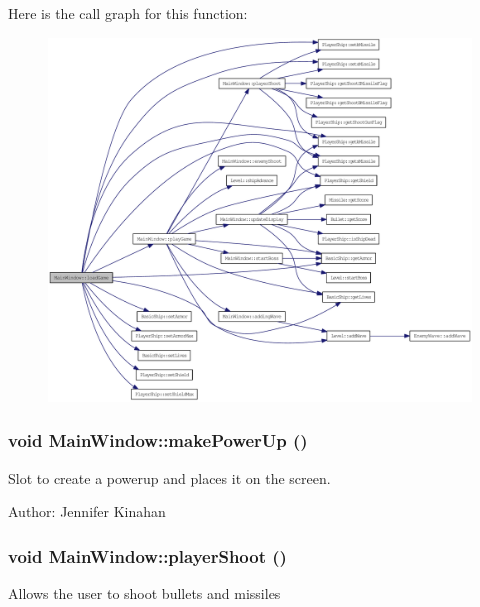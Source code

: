 Here is the call graph for this function:\nopagebreak
\begin{figure}[H]
\begin{center}
\leavevmode
\includegraphics[width=420pt]{class_main_window_af32531cf9be0011b3b3aa9cb1c159633_cgraph}
\end{center}
\end{figure}
\hypertarget{class_main_window_afa51f8b618e297e7b2ed6e9d1bfd38d7}{
\subsubsection[{makePowerUp}]{\setlength{\rightskip}{0pt plus 5cm}void MainWindow::makePowerUp ()}}
\label{class_main_window_afa51f8b618e297e7b2ed6e9d1bfd38d7}
Slot to create a powerup and places it on the screen.

Author: Jennifer Kinahan \hypertarget{class_main_window_a82a6ee47ad6e73ab2eb6816ee6324708}{
\subsubsection[{playerShoot}]{\setlength{\rightskip}{0pt plus 5cm}void MainWindow::playerShoot ()}}
\label{class_main_window_a82a6ee47ad6e73ab2eb6816ee6324708}
Allows the user to shoot bullets and missiles

